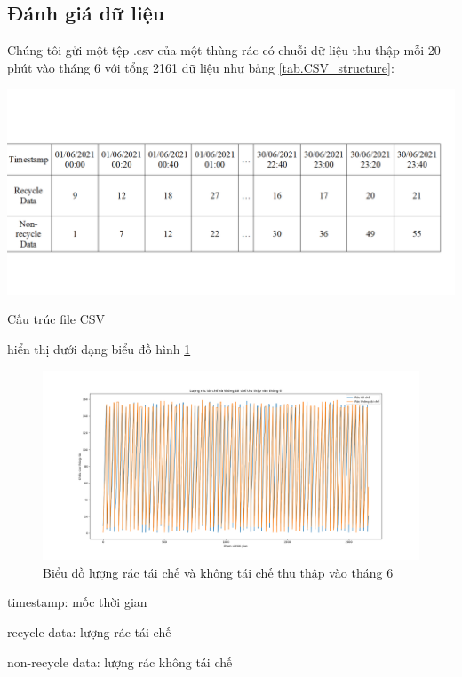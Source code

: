 \subsection{Đánh giá dữ liệu}
Chúng tôi gửi một tệp .csv của một thùng rác có chuỗi dữ liệu thu thập mỗi 20 phút vào tháng 6 với tổng 2161 dữ liệu như bảng \ref{tab.CSV_structure}:
\begin{table}[H]
    \centering
    \includegraphics[width=\textwidth]{images/Khanh/Python/CSV_Structure.PNG}
    \caption{Cấu trúc file CSV}
    \label{tab.CSV_structure}
\end{table}

hiển thị dưới dạng biểu đồ hình \ref{fig:CSV_plot_chart}
\begin{figure}[H]
    \centering
    \includegraphics[width=\textwidth]{images/Khanh/Python/CSV_Plot_Chart.png}
    \caption{Biểu đồ lượng rác tái chế và không tái chế thu thập vào tháng 6}
    \label{fig:CSV_plot_chart}
\end{figure}

\begin{description}
    \item timestamp: mốc thời gian
    \item recycle data: lượng rác tái chế
    \item non-recycle data: lượng rác không tái chế
\end{description}

